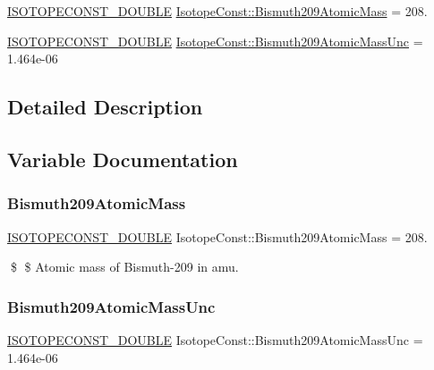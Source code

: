 \begin{DoxyCompactItemize}
\item 
\mbox{\hyperlink{group___isotope_const-_macros_ga8f45a7272ce02c0b4c65c44636ed719a}{I\+S\+O\+T\+O\+P\+E\+C\+O\+N\+S\+T\+\_\+\+D\+O\+U\+B\+LE}} \mbox{\hyperlink{group___isotope_const-_bismuth-_bi209_ga3c638927cb621f8d670de9765c7318ba}{Isotope\+Const\+::\+Bismuth209\+Atomic\+Mass}} = 208.
\item 
\mbox{\hyperlink{group___isotope_const-_macros_ga8f45a7272ce02c0b4c65c44636ed719a}{I\+S\+O\+T\+O\+P\+E\+C\+O\+N\+S\+T\+\_\+\+D\+O\+U\+B\+LE}} \mbox{\hyperlink{group___isotope_const-_bismuth-_bi209_gaa9ebb8a93937db943cc2e7c116d54913}{Isotope\+Const\+::\+Bismuth209\+Atomic\+Mass\+Unc}} = 1.\+464e-\/06
\end{DoxyCompactItemize}


\subsection{Detailed Description}


\subsection{Variable Documentation}
\mbox{\label{group___isotope_const-_bismuth-_bi209_ga3c638927cb621f8d670de9765c7318ba}} 
\subsubsection{\texorpdfstring{Bismuth209\+Atomic\+Mass}{Bismuth209AtomicMass}}
{\footnotesize\ttfamily \mbox{\hyperlink{group___isotope_const-_macros_ga8f45a7272ce02c0b4c65c44636ed719a}{I\+S\+O\+T\+O\+P\+E\+C\+O\+N\+S\+T\+\_\+\+D\+O\+U\+B\+LE}} Isotope\+Const\+::\+Bismuth209\+Atomic\+Mass = 208.}

\$ \$ Atomic mass of Bismuth-\/209 in amu. \mbox{\label{group___isotope_const-_bismuth-_bi209_gaa9ebb8a93937db943cc2e7c116d54913}} 
\subsubsection{\texorpdfstring{Bismuth209\+Atomic\+Mass\+Unc}{Bismuth209AtomicMassUnc}}
{\footnotesize\ttfamily \mbox{\hyperlink{group___isotope_const-_macros_ga8f45a7272ce02c0b4c65c44636ed719a}{I\+S\+O\+T\+O\+P\+E\+C\+O\+N\+S\+T\+\_\+\+D\+O\+U\+B\+LE}} Isotope\+Const\+::\+Bismuth209\+Atomic\+Mass\+Unc = 1.\+464e-\/06}

